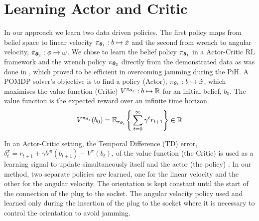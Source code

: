 

\section{Learning Actor and Critic}\label{ch4:learning-value-actor}

In our approach we learn two data driven policies. The first policy maps from belief space 
to linear velocity $\pi_{\boldsymbol{\theta}_1} : b \mapsto \dot{x}$ and the second from 
wrench to angular velocity, $ \pi_{\boldsymbol{\theta}_2} : \phi \mapsto \omega$.
We chose to learn the belief policy $\pi_{\boldsymbol{\theta}_1}$ in a Actor-Critic RL framework 
and the wrench policy $\pi_{\boldsymbol{\theta}_2}$ directly from the demonstrated data as was done 
in \cite[Chap. 5]{Kronander2015}, which proved to be efficient in overcoming jamming during the PiH. 
A POMDP solver's objective is to find a policy (Actor), $\pi_{\boldsymbol{\theta}_1}: b \mapsto \dot{x}$, which maximises 
the value function (Critic) $V^{\pi_{\boldsymbol{\theta}_1}} : b \mapsto \mathbb{R}$ for an initial belief, $b_{0}$. The value function
is the expected reward over an infinite time horizon.
\begin{equation}\label{eq:value_function}
  V^{\pi_{\boldsymbol{\theta}_1}}(b_0) = \mathbb{E}_{\pi_{\boldsymbol{\theta}_1}}\Bigg\{ \sum_{t=0}^{\infty} \gamma^{t} r_{t+1} \Bigg\} \in \mathbb{R}
\end{equation}

In an Actor-Critic setting, the Temporal Difference (TD) error, ${\delta^{\pi}_t = r_{t+1} + \gamma V^{\pi}(b_{t+1}) - V^{\pi}(b_t)}$, of the 
value function (the Critic) is used as a learning signal to update simultaneously itself and the actor (the policy)  \cite[Chap. 6]{sutton1998reinforcement}. In our method, 
two separate policies are learned, one for the linear velocity and the other for the angular velocity.
The orientation is kept constant until the start of the connection of the plug to the socket.
The angular velocity policy used and learned only during the insertion of the plug to the socket where it is necessary
to control the orientation to avoid jamming.

